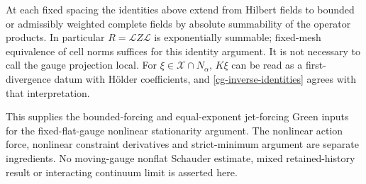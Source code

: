 \documentclass[11pt]{article}
\theoremstyle{remark}
\begin{document}
At each fixed spacing the identities above extend from Hilbert
fields to bounded or admissibly weighted complete fields by
absolute summability of the operator products. In particular
$R=\mathcal LZ\mathcal L$ is exponentially summable; fixed-mesh
equivalence of cell norms suffices for this identity argument.
It is not necessary to call the gauge projection local.
For $\xi\in\mathcal X\cap N_\alpha$, $K\xi$ can be read as
a first-divergence datum with H\"older coefficients, and
\eqref{cg-inverse-identities} agrees with that interpretation.

This supplies the bounded-forcing and equal-exponent jet-forcing
Green inputs for the fixed-flat-gauge nonlinear stationarity
argument. The nonlinear action force, nonlinear constraint
derivatives and strict-minimum argument are separate ingredients.
No moving-gauge nonflat Schauder estimate, mixed retained-history
result or interacting continuum limit is asserted here.
\end{document}
